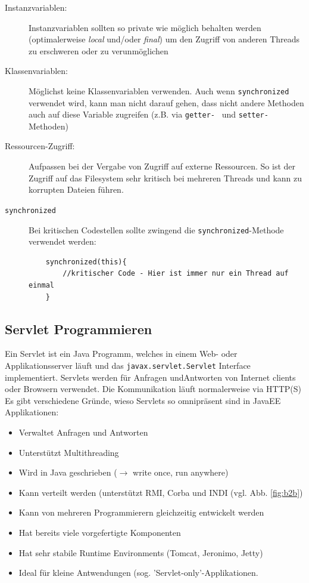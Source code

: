 \documentclass[a4paper, 11pt]{article}
\begin{document}
\begin{description}
	\item[Instanzvariablen: ] Instanzvariablen sollten so private wie möglich behalten werden (optimalerweise \textit{local} und/oder \textit{final}) um den Zugriff von anderen Threads zu erschweren oder zu verunmöglichen
	\item[Klassenvariablen: ] Möglichst keine Klassenvariablen verwenden. Auch wenn \texttt{synchronized} verwendet wird, kann man nicht darauf gehen, dass nicht andere Methoden auch auf diese Variable zugreifen (z.B. via \texttt{getter- } und \texttt{setter-} Methoden)
	\item[Ressourcen-Zugriff: ] Aufpassen bei der Vergabe von Zugriff auf externe Ressourcen. So ist der Zugriff auf das Filesystem sehr kritisch bei mehreren Threads und kann zu korrupten Dateien führen.
	\item[\texttt{synchronized}] Bei kritischen Codestellen sollte zwingend die \texttt{synchronized}-Methode verwendet werden:
	
	\begin{lstlisting}
	synchronized(this){
		//kritischer Code - Hier ist immer nur ein Thread auf einmal
	}
	\end{lstlisting}
\end{description}

\subsection{Servlet Programmieren}
Ein Servlet ist ein Java Programm, welches in einem Web- oder Applikationsserver läuft und das \texttt{javax.servlet.Servlet} Interface implementiert. Servlets werden für Anfragen undAntworten von Internet clients oder Browsern verwendet. Die Kommunikation läuft normalerweise via HTTP(S)\\


Es gibt verschiedene Gründe, wieso Servlets so omnipräsent sind in JavaEE Applikationen:

\begin{itemize}
    \item Verwaltet Anfragen und Antworten
    \item Unterstützt Multithreading
    \item Wird in Java geschrieben ($\rightarrow$ write once, run anywhere)
    \item Kann verteilt werden (unterstützt RMI, Corba und INDI (vgl. Abb. \ref{fig:b2b})
    \item Kann von mehreren Programmierern gleichzeitig entwickelt werden
    \item Hat bereits viele vorgefertigte Komponenten
    \item Hat sehr stabile Runtime Environments (Tomcat, Jeronimo, Jetty)
    \item Ideal für kleine Antwendungen (sog. 'Servlet-only'-Applikationen.
\end{itemize}
\end{document}
